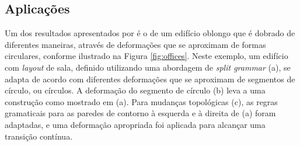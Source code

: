 \subsection{Aplicações}
\label{sec:zmugg2014_sec5}

Um dos resultados apresentados por  é o de um edifício oblongo que é dobrado de diferentes maneiras, através de deformações que se aproximam de formas circulares, conforme ilustrado na Figura \ref{fig:offices}. Neste exemplo, um edifício com \textit{layout} de sala, definido utilizando uma abordagem de \textit{split grammar} (a), se adapta de acordo com diferentes deformações que se aproximam de segmentos de círculo, ou círculos. A deformação do segmento de círculo (b) leva a uma construção como mostrado em (a). Para mudanças topológicas (c), as regras gramaticais para as paredes de contorno à esquerda e à direita de (a) foram adaptadas, e uma deformação apropriada foi aplicada para alcançar uma transição contínua.

\begin{figure}[h!]
	\centering
	\captionsetup{width=15cm}
	{}	
\end{figure}


